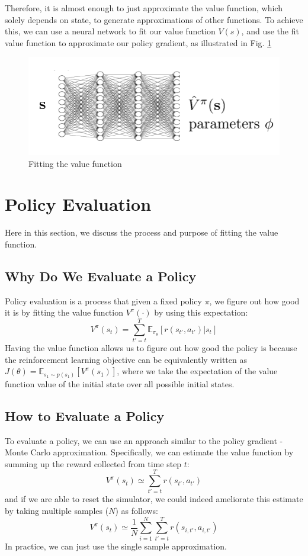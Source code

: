 Therefore, it is almost enough to just approximate the value function, which solely depends on state, to generate approximations of other functions. To achieve this, we can use a neural network to fit our value function $V(s)$, and use the fit value function to approximate our policy gradient, as illustrated in Fig. \ref{fig:fitV} 
\begin{figure}
    \centering
    \includegraphics[scale=0.5]{figures/fitV.png}
    \caption{Fitting the value function}
    \label{fig:fitV}
\end{figure}

\section{Policy Evaluation}
Here in this section, we discuss the process and purpose of fitting the value function.

\subsection{Why Do We Evaluate a Policy}
Policy evaluation is a process that given a fixed policy $\pi$, we figure out how good it is by fitting the value function $V^\pi(\cdot)$ by using this expectation:
$$V^\pi(s_t) = \sum_{t'=t}^T\mathbb{E}_{\pi_\theta}\left[r(s_{t'},a_{t'})|s_t\right]$$
Having the value function allows us to figure out how good the policy is because the reinforcement learning objective can be equivalently written as $J(\theta) = \mathbb{E}_{s_1\sim p(s_1)}\left[V^\pi(s_1)\right]$, where we take the expectation of the value function value of the initial state over all possible initial states.
\subsection{How to Evaluate a Policy}
To evaluate a policy, we can use an approach similar to the policy gradient - Monte Carlo approximation. Specifically, we can estimate the value function by summing up the reward collected from time step $t$:
$$V^\pi(s_t) \simeq \sum_{t'=t}^T r(s_{t'},a_{t'})$$
and if we are able to reset the simulator, we could indeed ameliorate this estimate by taking multiple samples ($N$) as follows:
$$V^\pi(s_t) \simeq \frac{1}{N}\sum_{i=1}^N\sum_{t'=t}^T r(s_{i,t'},a_{i,t'})$$
In practice, we can just use the single sample approximation.

